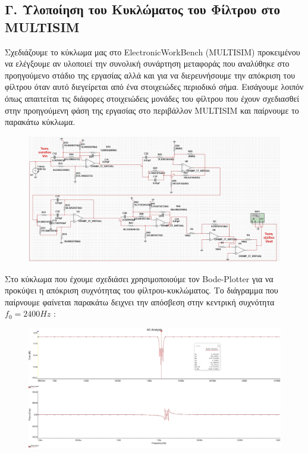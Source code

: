 \documentclass{article}
\begin{document}
{{\subsection*{Γ. Υλοποίηση του Κυκλώματος του Φίλτρου στο MULTISIM}
\large{}
Σχεδιάζουμε το κύκλωμα μας στο ElectronicWorkBench (MULTISIM) προκειμένου να ελέγξουμε αν υλοποιεί την συνολική συνάρτηση μεταφοράς που αναλύθηκε στο προηγούμενο στάδιο της εργασίας αλλά και για να διερευνήσουμε την απόκριση του φίλτρου όταν αυτό διεγείρεται από ένα στοιχειώδες περιοδικό σήμα.
Εισάγουμε λοιπόν όπως απαιτείται τις διάφορες στοιχειώδεις μονάδες του φίλτρου που έχουν σχεδιασθεί στην προηγούμενη φάση της εργασίας στο περιβάλλον MULTISIM και παίρνουμε το παρακάτω κύκλωμα.
\begin{figure}[h!]
\centering
 	\advance\leftskip-3.5cm
  \includegraphics[width=200mm,scale=2]{thema3/multisim0.jpg}
\end{figure} 
\clearpage
Στο κύκλωμα που έχουμε σχεδιάσει χρησιμοποιούμε τον Bode-Plotter για να προκύψει η απόκριση συχνότητας του φίλτρου-κυκλώματος. Το διάγραμμα που παίρνουμε φαίνεται παρακάτω δειχνει την απόσβεση στην κεντρική συχνότητα $f_0 = 2400Hz$ :
\begin{figure}[h!]
\centering
 	\advance\leftskip-1cm
  \includegraphics[width=140mm,scale=2]{thema3/multisim1a.jpg}

\end{figure}}}
\end{document}
